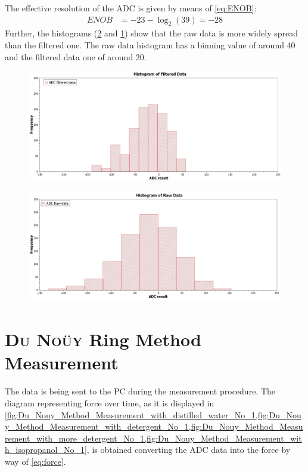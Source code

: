         The effective resolution of the ADC is given by means of \cref{eq:ENOB}:
        \begin{align*}
            ENOB&=-23-\log_2(39)=-28
        \end{align*}
        Further, the histograms (\cref{fig:histogram_raw_data} and \cref{fig:histogram_filtered_data}) show that the raw
        data is more widely spread than the filtered one. The raw data histogram has a binning value of around 40 and the
        filtered data one of around 20.
        \begin{figure}[H]
            \centering
            \includegraphics[width=.9\textwidth]{scidavis/histogram_filtered_data.jpg}
            \caption[]{}
            \label{fig:histogram_filtered_data}
        \end{figure}
        \begin{figure}[H]
            \centering
            \includegraphics[width=.9\textwidth]{scidavis/histogram_raw_data.jpg}
            \caption[]{}
            \label{fig:histogram_raw_data}
        \end{figure}
    \section{\textsc{Du Noüy} Ring Method Measurement}
        The data is being sent to the PC during the measurement procedure. The diagram representing force over time, as it
        is displayed in \cref{fig:Du_Nouy_Method_Measurement_with_distilled_water_No_1,fig:Du_Nouy_Method_Measurement_with_detergent_No_1,fig:Du_Nouy_Method_Measurement_with_more_detergent_No_1,fig:Du_Nouy_Method_Measurement_with_isopropanol_No_1}, is obtained converting the ADC data into the force by way of \cref{eq:force}. 
